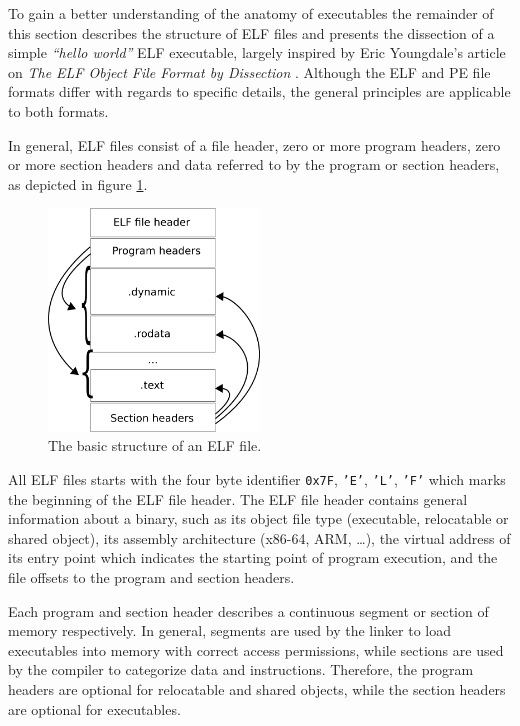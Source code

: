 To gain a better understanding of the anatomy of executables the remainder of this section describes the structure of ELF files and presents the dissection of a simple \textit{``hello world''} ELF executable, largely inspired by Eric Youngdale's article on \textit{The ELF Object File Format by Dissection} \cite{elf_dissection}. Although the ELF and PE file formats differ with regards to specific details, the general principles are applicable to both formats.

In general, ELF files consist of a file header, zero or more program headers, zero or more section headers and data referred to by the program or section headers, as depicted in figure \ref{fig:elf_file_structure}.

\begin{figure}[htbp]
	\begin{center}
		\includegraphics[width=0.5\textwidth]{inc/elf_file_structure.png}
		\caption{The basic structure of an ELF file. \protect\footnotemark}
		\label{fig:elf_file_structure}
	\end{center}
\end{figure}

All ELF files starts with the four byte identifier \texttt{0x7F}, \texttt{'E'}, \texttt{'L'}, \texttt{'F'} which marks the beginning of the ELF file header. The ELF file header contains general information about a binary, such as its object file type (executable, relocatable or shared object), its assembly architecture (x86-64, ARM, …), the virtual address of its entry point which indicates the starting point of program execution, and the file offsets to the program and section headers.

Each program and section header describes a continuous segment or section of memory respectively. In general, segments are used by the linker to load executables into memory with correct access permissions, while sections are used by the compiler to categorize data and instructions. Therefore, the program headers are optional for relocatable and shared objects, while the section headers are optional for executables.

